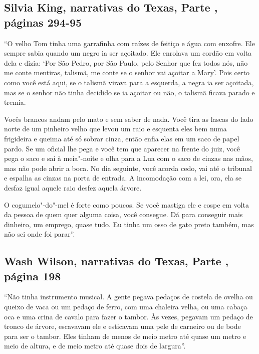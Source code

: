 \subsection{Silvia King, narrativas do Texas, Parte , páginas 294-95}
\label{ref167}

``O velho Tom tinha uma garrafinha com raízes de feitiço e água com
enxofre. Ele sempre sabia quando um negro ia ser açoitado. Ele enrolava
um cordão em volta dela e dizia: `Por São Pedro, por São Paulo, pelo
Senhor que fez todos nós, não me conte mentiras, talismã, me conte se o
senhor vai açoitar a Mary'. Pois certo como você está aqui, se o talismã
virava para a esquerda, a negra ia ser açoitada, mas se o senhor não
tinha decidido se ia açoitar ou não, o talismã ficava parado e tremia.

Vocês brancos andam pelo mato e sem saber de nada. Você tira as lascas
do lado norte de um pinheiro velho que levou um raio e esquenta eles bem
numa frigideira e queima até só sobrar cinza, então enfia elas em um
saco de papel pardo. Se um oficial lhe pega e você tem que aparecer na
frente do juiz, você pega o saco e sai à meia"-noite e olha para a Lua
com o saco de cinzas nas mãos, mas não pode abrir a boca. No dia
seguinte, você acorda cedo, vai até o tribunal e espalha as cinzas na
porta de entrada. A incomodação com a lei, ora, ela se desfaz igual
aquele raio desfez aquela árvore.

O cogumelo"-do"-mel é forte como poucos. Se você mastiga ele e cospe em
volta da pessoa de quem quer alguma coisa, você consegue. Dá para
conseguir mais dinheiro, um emprego, quase tudo. Eu tinha um osso de
gato preto também, mas não sei onde foi parar''.

\subsection{Wash Wilson, narrativas do Texas, Parte , página 198}
\label{ref301}

``Não tinha instrumento musical. A gente pegava pedaços de costela de
ovelha ou queixo de vaca ou um pedaço de ferro, com uma chaleira velha,
ou uma cabaça oca e uma crina de cavalo para fazer o tambor. Às vezes,
pegavam um pedaço de tronco de árvore, escavavam ele e esticavam uma
pele de carneiro ou de bode para ser o tambor. Eles tinham de menos de
meio metro até quase um metro e meio de altura, e de meio metro até
quase dois de largura''.

\pagebreak
\thispagestyle{empty}

